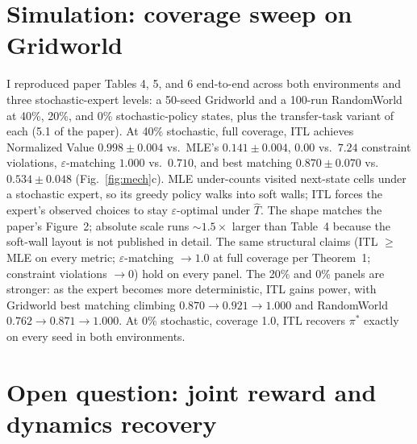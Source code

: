 \documentclass[11pt]{article}
\begin{document}
\section{Simulation: coverage sweep on Gridworld}

I reproduced paper Tables 4, 5, and 6 end-to-end across both environments and three stochastic-expert levels: a 50-seed Gridworld and a 100-run RandomWorld at 40\%, 20\%, and 0\% stochastic-policy states, plus the transfer-task variant of each (\textsection{}5.1 of the paper). At 40\% stochastic, full coverage, ITL achieves Normalized Value $0.998 \pm 0.004$ vs.\ MLE's $0.141 \pm 0.004$, $0.00$ vs.\ $7.24$ constraint violations, $\varepsilon$-matching $1.000$ vs.\ $0.710$, and best matching $0.870 \pm 0.070$ vs.\ $0.534 \pm 0.048$ (Fig.~\ref{fig:mech}c). MLE under-counts visited next-state cells under a stochastic expert, so its greedy policy walks into soft walls; ITL forces the expert's observed choices to stay $\varepsilon$-optimal under $\hat T$. The shape matches the paper's Figure~2; absolute scale runs $\sim 1.5\times$ larger than Table~4 because the soft-wall layout is not published in detail. The same structural claims (ITL $\ge$ MLE on every metric; $\varepsilon$-matching $\to 1.0$ at full coverage per Theorem~1; constraint violations $\to 0$) hold on every panel. The 20\% and 0\% panels are stronger: as the expert becomes more deterministic, ITL gains power, with Gridworld best matching climbing $0.870 \to 0.921 \to 1.000$ and RandomWorld $0.762 \to 0.871 \to 1.000$. At 0\% stochastic, coverage 1.0, ITL recovers $\pi^{*}$ exactly on every seed in both environments.

\section{Open question: joint reward and dynamics recovery}
\end{document}
